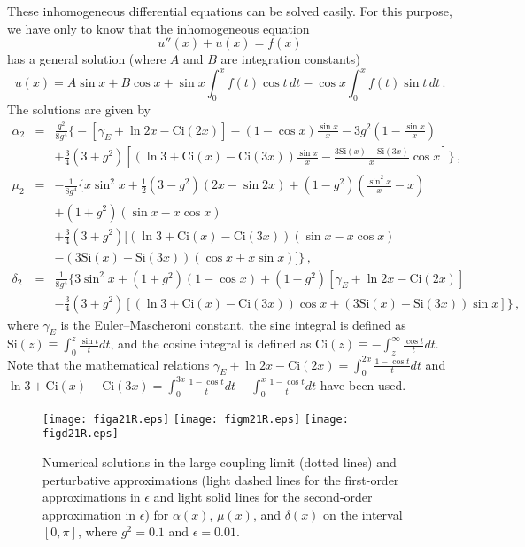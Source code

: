 \documentclass[
aps,prd,
12pt,%
nopreprintnumbers,
showpacs,
eqsecnum,
nofootinbib
]{revtex4-1}
\begin{document}
These inhomogeneous differential equations can be solved easily.
For this purpose, we have only to know that the inhomogeneous equation
\begin{equation}
u''(x)+u(x)=f(x)
\end{equation}
has a general solution (where $A$ and $B$ are integration constants)
\begin{equation}
u(x)=A\sin x+B\cos x+\sin x\int_0^xf(t)\cos t\, dt-\cos x\int_0^xf(t)\sin t\, dt\,.
\end{equation}
The solutions are given by
\begin{eqnarray}
\alpha_2&=&\frac{q^2}{8g^4}\Big\{-[\gamma_E+\ln 2x-\mbox{Ci}(2x)]
-(1-\cos x)\frac{\sin x}{x}%
-3%
g^2\left(1-\frac{\sin x}{x}\right)\nonumber \\
& &+\frac{3}{4}(3+g^2)\left[(\ln
3+\mbox{Ci}(x)-\mbox{Ci}(3x))\frac{\sin
x}{x}-\frac{3\mbox{Si}(x)-\mbox{Si}(3x)}{x}\cos x\right]\Big\}\,,\\
\mu_{2}&=&-\frac{1}{8g^4}\Big\{x\sin^2x+\frac{1}{2}(3-g^2)(2x-\sin 2x)
+(1-g^2)\left(\frac{\sin^2 x}{x}-x\right)\nonumber \\ & &+(1+%
g^2)(\sin
x-x\cos x)\nonumber \\ & &+\frac{3}{4}(3+g^2)[(\ln
3+\mbox{Ci}(x)-\mbox{Ci}(3x))(\sin x-x\cos x)\nonumber \\
& &-
(3\mbox{Si}(x)-\mbox{Si}(3x))(\cos x+x\sin x)]\Big\}\,,\\
\delta_2&=&\frac{1}{8g^4}\Big\{3\sin^2 x+(1+%
g^2)(1-\cos
x)+(1-g^2)[\gamma_E+\ln 2x-\mbox{Ci}(2x)]\nonumber \\
& &-\frac{3}{4}(3+g^2)\left[(\ln
3+\mbox{Ci}(x)-\mbox{Ci}(3x))\cos x+(3\mbox{Si}(x)-\mbox{Si}(3x))\sin
x\right]\Big\}
\,,
\end{eqnarray}
where $\gamma_E$ is the Euler--Mascheroni constant,
the sine integral is defined as $\mbox{Si}(z)\equiv\int_0^z\frac{\sin t}{t}dt$,
and the cosine integral is defined as $\mbox{Ci}(z)\equiv-\int_z^\infty\frac{\cos
t}{t}dt$.
Note that the mathematical relations
$\gamma_E+\ln 2x-\mbox{Ci}(2x)=\int_0^{2x}\frac{1-\cos t}{t}dt$
and
$\ln 3+\mbox{Ci}(x)-\mbox{Ci}(3x)=\int_0^{3x}\frac{1-\cos t}{t}dt
-\int_0^{x}\frac{1-\cos t}{t}dt$ have been used.

\begin{figure}[ht]
\centering
\texttt{[image: figa21R.eps]}
\texttt{[image: figm21R.eps]}
\texttt{[image: figd21R.eps]}
\caption{
Numerical solutions in the large coupling limit (dotted lines) and perturbative
approximations (light dashed lines for the first-order approximations in $\epsilon$
and light solid lines for the second-order approximation in $\epsilon$) for
$\alpha(x)$,
$\mu(x)$, and
$\delta(x)$ on the
interval $[0,
\pi]$, where $g^2=0.1$ and $\epsilon=0.01$.}
\label{fig21}
\end{figure}
\end{document}
